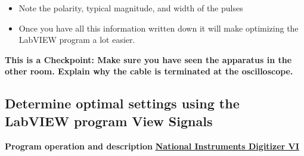 \documentclass{../lab}
\begin{document}
\begin{enumerate}
\begin{itemize}
        \item Note the polarity, typical magnitude, and width of the pulses

        \item Once you have all this information written down it will make optimizing the LabVIEW program a lot easier.

    \end{itemize}

\end{enumerate}


\textbf{ This is a Checkpoint: Make sure you have seen the apparatus in the other room. Explain why the cable is terminated at the oscilloscope. }

\subsection{Determine optimal settings using the LabVIEW program View Signals}

\textbf{Program operation and description} \href{http://experimentationlab.berkeley.edu/node/88}{\textbf{National Instruments Digitizer VI}}
\end{document}
